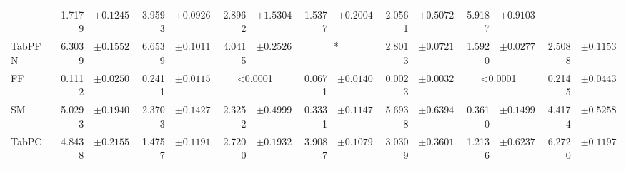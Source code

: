 \begin{table}[htbp]
{\begin{tabular}{
l
r@{}l
r@{}l
r@{}l
r@{}l
r@{}l
r@{}l
r@{}l
}
 & 1.7179 & \footnotesize{$\pm 0.1245$}
 & 3.9593 & \footnotesize{$\pm 0.0926$}
 & 2.8962 & \footnotesize{$\pm 1.5304$}
 & 1.5377 & \footnotesize{$\pm 0.2004$}
 & 2.0561 & \footnotesize{$\pm 0.5072$}
 & 5.9187 & \footnotesize{$\pm 0.9103$}
 \\
    TabPFN & 6.3039 & \footnotesize{$\pm 0.1552$}
 & 6.6539 & \footnotesize{$\pm 0.1011$}
 & 4.0415 & \footnotesize{$\pm 0.2526$}
 & \multicolumn{2}{c}{*} & 2.8013 & \footnotesize{$\pm 0.0721$}
 & 1.5920 & \footnotesize{$\pm 0.0277$}
 & 2.5088 & \footnotesize{$\pm 0.1153$}
 \\
    \midrule
    FF & 0.1112 & \footnotesize{$\pm 0.0250$}
 & 0.2411 & \footnotesize{$\pm 0.0115$}
 & \multicolumn{2}{c}{<0.0001} & 0.0671 & \footnotesize{$\pm 0.0140$}
 & 0.0023 & \footnotesize{$\pm 0.0032$}
 & \multicolumn{2}{c}{<0.0001} & 0.2145 & \footnotesize{$\pm 0.0443$}
 \\
    SM & 5.0293 & \footnotesize{$\pm 0.1940$}
 & 2.3703 & \footnotesize{$\pm 0.1427$}
 & 2.3252 & \footnotesize{$\pm 0.4999$}
 & 0.3331 & \footnotesize{$\pm 0.1147$}
 & 5.6938 & \footnotesize{$\pm 0.6394$}
 & 0.3610 & \footnotesize{$\pm 0.1499$}
 & 4.4174 & \footnotesize{$\pm 0.5258$}
 \\
    TabPC & 4.8438 & \footnotesize{$\pm 0.2155$}
 & 1.4757 & \footnotesize{$\pm 0.1191$}
 & 2.7200 & \footnotesize{$\pm 0.1932$}
 & 3.9087 & \footnotesize{$\pm 0.1079$}
 & 3.0309 & \footnotesize{$\pm 0.3601$}
 & 1.2136 & \footnotesize{$\pm 0.6237$}
 & 6.2720 & \footnotesize{$\pm 0.1197$}
 \\
    \bottomrule[1.0pt]
\end{tabular}}
\end{table}
